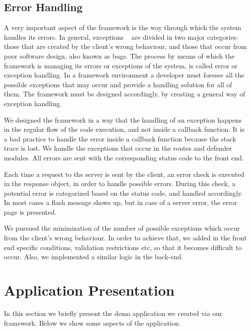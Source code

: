 \subsection{Error Handling}
\label{errorHandling}
A very important aspect of the framework is the way through which the system handles its errors. In general, exceptions ~\cite{carlson2000method} are divided in two major categories: those that are created by the client's wrong behaviour, and those that occur from poor software design, also known as bugs. The process by means of which the framework is managing its errors or exceptions of the system, is called error or exception handling. In a framework environment a developer must foresee all the possible exceptions that may occur and provide a handling solution for all of them. The framework must be designed accordingly, by creating a general way of exception handling. \par
	We designed the framework in a way that the handling of an exception happens in the regular flow of the code execution, and not inside a callback function. It is a bad practice to handle the error inside a callback function because the stack trace is lost. We handle the exceptions that occur in the routes and defender modules. All errors are sent with the corresponding status code to the front end. \par 
	 Each time a request to the server is sent by the client, an error check is executed in the response object, in order to handle possible errors. During this check, a potential error is categorized based on the status code, and handled accordingly. In most cases a flash message shows up, but in case of a server error, the error page is presented. \par 
	We pursued the minimization of the number of possible exceptions which occur from the client's wrong behaviour. In order to achieve that, we added in the front end specific conditions, validation restrictions etc, so that it becomes difficult to occur. Also, we implemented a similar logic in the back-end.


\section{Application Presentation}
In this section we briefly present the demo application we created via our framework. Below we show some aspects of the application.

